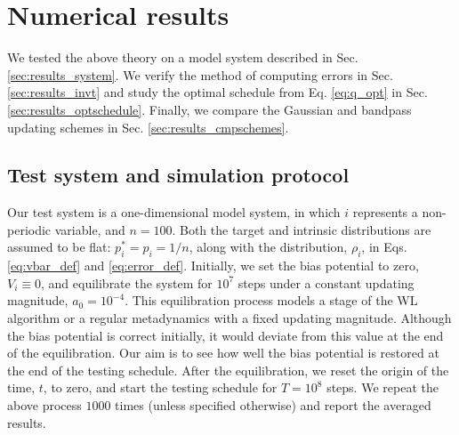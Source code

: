 \documentclass[reprint, superscriptaddress, floatfix]{revtex4-1}
\begin{document}
%
%




\section{\label{sec:results}
Numerical results}



We tested the above theory on a model system
described in Sec. \ref{sec:results_system}.
%
We verify the method of computing errors
in Sec. \ref{sec:results_invt}
%
and study the optimal schedule from
Eq. \eqref{eq:q_opt}
in Sec. \ref{sec:results_optschedule}.
%
Finally, we compare the Gaussian and
bandpass updating schemes %
in Sec. \ref{sec:results_cmpschemes}.



\subsection{\label{sec:results_system}
Test system and simulation protocol}



Our test system is a one-dimensional model system, in which
$i$ represents a non-periodic variable,
and $n = 100$.
%
Both the target and intrinsic distributions
are assumed to be flat:
$p^*_i = p_i = 1/n$,
along with the distribution, $\rho_i$, in Eqs.
\eqref{eq:vbar_def} and \eqref{eq:error_def}.
%
%
Initially,
we set the bias potential to zero,
$V_i \equiv 0$,
and equilibrate the system for $10^7$ steps
under a constant updating magnitude,
$a_0 = 10^{-4}$.
%
This equilibration process models
a stage of the WL algorithm or
a regular metadynamics
with a fixed updating magnitude.
%
Although the bias potential is correct initially,
it would deviate from this value
at the end of the equilibration.
%
Our aim is to see how well
the bias potential is restored
at the end of the testing schedule.
%
After the equilibration,
we reset the origin of the time, $t$, to zero,
and start the testing schedule
for $T = 10^8$ steps.
%
We repeat the above process $1000$ times (unless specified otherwise)
and report the averaged results.
\end{document}
